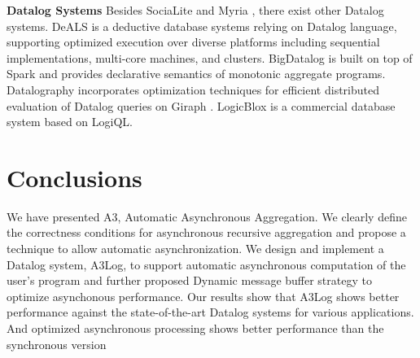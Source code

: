 \noindent\textbf{Datalog Systems}
Besides SociaLite \cite{Lam:2013:SDE:2510649.2511289,Seo:2013:DSD:2556549.2556572} and Myria \cite{Halperin:2014:DMB:2588555.2594530,Wang:2015:AFR:2824032.2824052}, there exist other Datalog systems. DeALS \cite{Shkapsky:2013:GQN:2536274.2536290,7113340} is a deductive database systems relying on Datalog language, supporting optimized execution over diverse platforms including sequential implementations, multi-core machines, and clusters. BigDatalog \cite{Shkapsky:2016:BDA:2882903.2915229} is built on top of Spark \cite{Zaharia:2010:SCC:1863103.1863113} and provides declarative semantics of monotonic aggregate programs. Datalography \cite{7840589} incorporates optimization techniques for efficient distributed evaluation of Datalog queries on Giraph \cite{giraph}. LogicBlox \cite{Aref:2015:DIL:2723372.2742796} is a commercial database system based on LogiQL.

\section{Conclusions}
\label{sec:conclusion}
We have presented A3, Automatic Asynchronous Aggregation. We clearly define the correctness conditions for asynchronous recursive aggregation and propose a technique to allow automatic asynchronization. We design and implement a Datalog system, A3Log, to support automatic asynchronous computation of the user's program and further proposed Dynamic message buffer strategy to optimize asynchonous performance. Our results show that A3Log shows better performance against the state-of-the-art Datalog systems for various applications. And optimized asynchronous processing shows better performance than the  synchronous version

